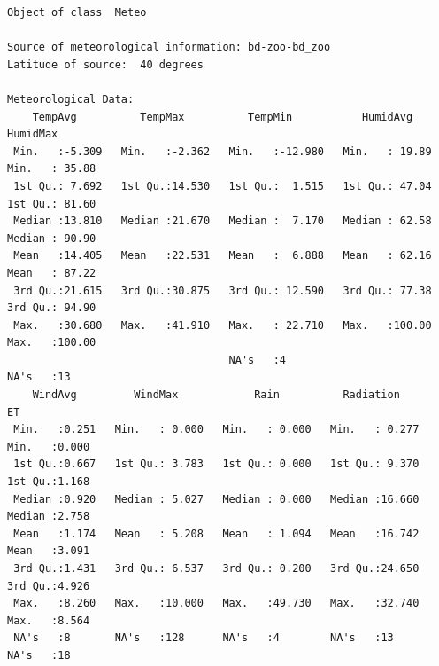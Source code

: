\begin{verbatim}
Object of class  Meteo 

Source of meteorological information: bd-zoo-bd_zoo 
Latitude of source:  40 degrees

Meteorological Data:
    TempAvg          TempMax          TempMin           HumidAvg         HumidMax     
 Min.   :-5.309   Min.   :-2.362   Min.   :-12.980   Min.   : 19.89   Min.   : 35.88  
 1st Qu.: 7.692   1st Qu.:14.530   1st Qu.:  1.515   1st Qu.: 47.04   1st Qu.: 81.60  
 Median :13.810   Median :21.670   Median :  7.170   Median : 62.58   Median : 90.90  
 Mean   :14.405   Mean   :22.531   Mean   :  6.888   Mean   : 62.16   Mean   : 87.22  
 3rd Qu.:21.615   3rd Qu.:30.875   3rd Qu.: 12.590   3rd Qu.: 77.38   3rd Qu.: 94.90  
 Max.   :30.680   Max.   :41.910   Max.   : 22.710   Max.   :100.00   Max.   :100.00  
                                   NA's   :4                          NA's   :13      
    WindAvg         WindMax            Rain          Radiation            ET       
 Min.   :0.251   Min.   : 0.000   Min.   : 0.000   Min.   : 0.277   Min.   :0.000  
 1st Qu.:0.667   1st Qu.: 3.783   1st Qu.: 0.000   1st Qu.: 9.370   1st Qu.:1.168  
 Median :0.920   Median : 5.027   Median : 0.000   Median :16.660   Median :2.758  
 Mean   :1.174   Mean   : 5.208   Mean   : 1.094   Mean   :16.742   Mean   :3.091  
 3rd Qu.:1.431   3rd Qu.: 6.537   3rd Qu.: 0.200   3rd Qu.:24.650   3rd Qu.:4.926  
 Max.   :8.260   Max.   :10.000   Max.   :49.730   Max.   :32.740   Max.   :8.564  
 NA's   :8       NA's   :128      NA's   :4        NA's   :13       NA's   :18
\end{verbatim}

